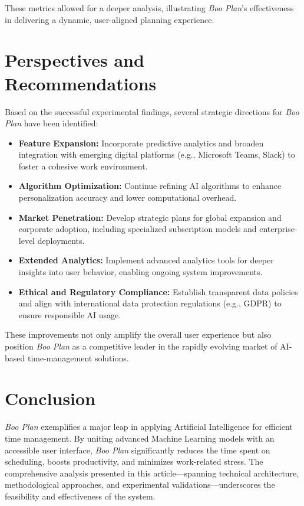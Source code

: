 \documentclass[14pt, english]{gost-7-32} %
\begin{document}
These metrics allowed for a deeper analysis, illustrating \textit{Boo Plan}'s effectiveness in delivering a dynamic, user-aligned planning experience.

\section{Perspectives and Recommendations}

Based on the successful experimental findings, several strategic directions for \textit{Boo Plan} have been identified:

\begin{itemize}
    \item \textbf{Feature Expansion:} Incorporate predictive analytics and broaden integration with emerging digital platforms (e.g., Microsoft Teams, Slack) to foster a cohesive work environment.
    \item \textbf{Algorithm Optimization:} Continue refining AI algorithms to enhance personalization accuracy and lower computational overhead.
    \item \textbf{Market Penetration:} Develop strategic plans for global expansion and corporate adoption, including specialized subscription models and enterprise-level deployments.
    \item \textbf{Extended Analytics:} Implement advanced analytics tools for deeper insights into user behavior, enabling ongoing system improvements.
    \item \textbf{Ethical and Regulatory Compliance:} Establish transparent data policies and align with international data protection regulations (e.g., GDPR) to ensure responsible AI usage.
\end{itemize}

These improvements not only amplify the overall user experience but also position \textit{Boo Plan} as a competitive leader in the rapidly evolving market of AI-based time-management solutions.

\section{Conclusion}

\textit{Boo Plan} exemplifies a major leap in applying Artificial Intelligence for efficient time management. By uniting advanced Machine Learning models with an accessible user interface, \textit{Boo Plan} significantly reduces the time spent on scheduling, boosts productivity, and minimizes work-related stress. The comprehensive analysis presented in this article---spanning technical architecture, methodological approaches, and experimental validations---underscores the feasibility and effectiveness of the system.
\end{document}
